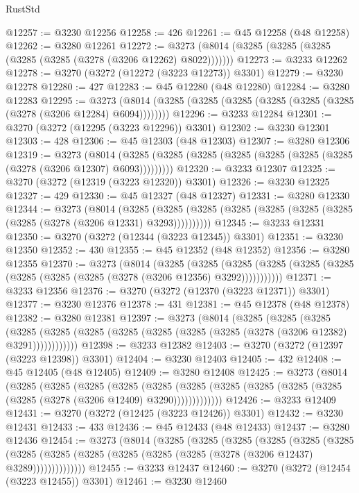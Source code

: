 \begin{lexlean}{RustStd}
\begin{coremodule}
{\begin{coremodule}
{{{{{{{{{{{{{{{{{{{{{{{{{{{{{{{{{{{{{@12257 := @3230 @12256
@12258 := 426
@12261 := @45 @12258 (@48 @12258)
@12262 := @3280 @12261
@12272 := @3273 (@8014 (@3285 (@3285 (@3285 (@3285 (@3285 (@3278 (@3206 @12262) @8022)))))))
@12273 := @3233 @12262
@12278 := @3270 (@3272 (@12272 (@3223 @12273)) @3301)
@12279 := @3230 @12278
@12280 := 427
@12283 := @45 @12280 (@48 @12280)
@12284 := @3280 @12283
@12295 := @3273 (@8014 (@3285 (@3285 (@3285 (@3285 (@3285 (@3285 (@3278 (@3206 @12284) @6094))))))))
@12296 := @3233 @12284
@12301 := @3270 (@3272 (@12295 (@3223 @12296)) @3301)
@12302 := @3230 @12301
@12303 := 428
@12306 := @45 @12303 (@48 @12303)
@12307 := @3280 @12306
@12319 := @3273
    (@8014 (@3285 (@3285 (@3285 (@3285 (@3285 (@3285 (@3285 (@3278 (@3206 @12307) @6093)))))))))
@12320 := @3233 @12307
@12325 := @3270 (@3272 (@12319 (@3223 @12320)) @3301)
@12326 := @3230 @12325
@12327 := 429
@12330 := @45 @12327 (@48 @12327)
@12331 := @3280 @12330
@12344 := @3273
    (@8014
      (@3285 (@3285 (@3285 (@3285 (@3285 (@3285 (@3285 (@3285 (@3278 (@3206 @12331) @3293))))))))))
@12345 := @3233 @12331
@12350 := @3270 (@3272 (@12344 (@3223 @12345)) @3301)
@12351 := @3230 @12350
@12352 := 430
@12355 := @45 @12352 (@48 @12352)
@12356 := @3280 @12355
@12370 := @3273
    (@8014
      (@3285
        (@3285
          (@3285 (@3285 (@3285 (@3285 (@3285 (@3285 (@3285 (@3278 (@3206 @12356) @3292)))))))))))
@12371 := @3233 @12356
@12376 := @3270 (@3272 (@12370 (@3223 @12371)) @3301)
@12377 := @3230 @12376
@12378 := 431
@12381 := @45 @12378 (@48 @12378)
@12382 := @3280 @12381
@12397 := @3273
    (@8014
      (@3285
        (@3285
          (@3285
            (@3285 (@3285 (@3285 (@3285 (@3285 (@3285 (@3285 (@3278 (@3206 @12382) @3291))))))))))))
@12398 := @3233 @12382
@12403 := @3270 (@3272 (@12397 (@3223 @12398)) @3301)
@12404 := @3230 @12403
@12405 := 432
@12408 := @45 @12405 (@48 @12405)
@12409 := @3280 @12408
@12425 := @3273
    (@8014
      (@3285
        (@3285
          (@3285
            (@3285
              (@3285
                (@3285 (@3285 (@3285 (@3285 (@3285 (@3285 (@3278 (@3206 @12409) @3290)))))))))))))
@12426 := @3233 @12409
@12431 := @3270 (@3272 (@12425 (@3223 @12426)) @3301)
@12432 := @3230 @12431
@12433 := 433
@12436 := @45 @12433 (@48 @12433)
@12437 := @3280 @12436
@12454 := @3273
    (@8014
      (@3285
        (@3285
          (@3285
            (@3285
              (@3285
                (@3285
                  (@3285
                    (@3285 (@3285 (@3285 (@3285 (@3285 (@3278 (@3206 @12437) @3289))))))))))))))
@12455 := @3233 @12437
@12460 := @3270 (@3272 (@12454 (@3223 @12455)) @3301)
@12461 := @3230 @12460
}}}}}}}}}}}}}}}}}}}}}}}}}}}}}}}}}}}}}
\end{coremodule}}
\end{coremodule}
\end{lexlean}
